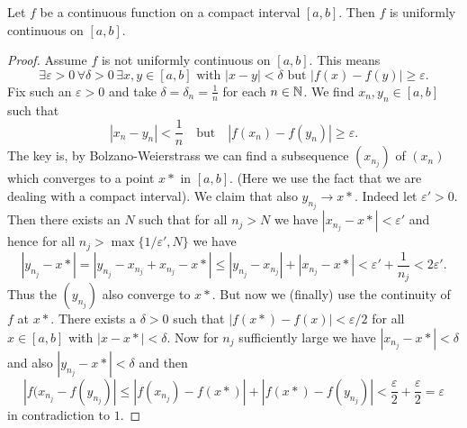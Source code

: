 \documentclass[10pt, a4paper]{article}
\begin{document}
\begin{theorem}\label{pre:analy:thm:contoncompactthenunicontonint}
    Let $f$ be a continuous function on a compact interval $[a, b]$.
    Then $f$ is uniformly continuous on $[a, b]$.
    \begin{proof}
        Assume $f$ is not uniformly continuous on $[a, b]$.
        This means
        \[
        \exists\varepsilon > 0\, \forall\delta > 0\, \exists x, y \in [a, b]\text{ with } |x - y| < \delta \text{ but } |f(x) - f(y)| \geq \varepsilon.
        \]
        Fix such an $\varepsilon > 0$ and take $\delta = \delta_n = \frac{1}{n}$ for each $n \in \mathbb{N}$.
        We find $x_n, y_n \in [a, b]$ such that
        \[
        |x_n - y_n| < \frac{1}{n}\quad\text{but}\quad|f(x_n) - f(y_n)| \geq \varepsilon.
        \]
        The key is,
        by Bolzano-Weierstrass we can find a subsequence $(x_{n_j})$ of $(x_n)$ which converges to a point $x*$ in $[a, b]$.
        (Here we use the fact that we are dealing with a compact interval).
        We claim that also $y_{n_j} \rightarrow x*$.
        Indeed let $\varepsilon' > 0$.
        Then there exists an $N$ such that for all $n_j > N$ we have $|x_{n_j} - x*| < \varepsilon'$ and hence for all $n_j > \max\{1 / \varepsilon', N\}$ we have
        \[
        |y_{n_j} - x*| = |y_{n_j} - x_{n_j} + x_{n_j} - x*| \leq |y_{n_j} - x_{n_j}| + |x_{n_j} - x*| < \varepsilon' + \frac{1}{n_j} < 2\varepsilon'.
        \]
        Thus the $(y_{n_j})$ also converge to $x*$.
        But now we
        (finally)
        use the continuity of $f$ at $x*$.
        There exists a $\delta > 0$ such that $|f(x*) - f(x)| < \varepsilon / 2$ for all $x \in [a, b]$ with $|x - x*| < \delta$.
        Now for $n_j$ sufficiently large we have $|x_{n_j} - x*| < \delta$ and also $|y_{n_j} - x*| < \delta$ and then
        \[
        |f(x_{n_j} - f(y_{n_j})| \leq |f(x_{n_j}) - f(x*)| + |f(x*) - f(y_{n_j})| < \frac{\varepsilon}{2} + \frac{\varepsilon}{2} = \varepsilon
        \]
        in contradiction to $1$.
    \end{proof}
\end{theorem}
\end{document}
